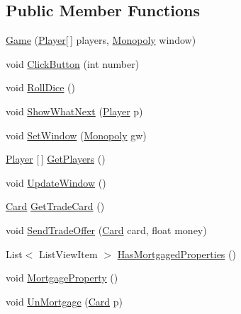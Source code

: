 \subsection*{Public Member Functions}
\begin{DoxyCompactItemize}
\item 
\mbox{\hyperlink{class_monopoly_1_1_main_1_1_game_ae2591415ce9bb2ca618cf67cc000792c}{Game}} (\mbox{\hyperlink{class_monopoly_1_1_players_1_1_player}{Player}}\mbox{[}$\,$\mbox{]} players, \mbox{\hyperlink{class_monopoly_1_1_main_1_1_monopoly}{Monopoly}} window)
\item 
void \mbox{\hyperlink{class_monopoly_1_1_main_1_1_game_a2eacf89a5ff116f370fd4bab3dc6222a}{Click\+Button}} (int number)
\item 
void \mbox{\hyperlink{class_monopoly_1_1_main_1_1_game_a8db7b2f4e7f53446d3af3312545eb5ee}{Roll\+Dice}} ()
\item 
void \mbox{\hyperlink{class_monopoly_1_1_main_1_1_game_a8b3ae822f53278aadf9358a4b770b0fa}{Show\+What\+Next}} (\mbox{\hyperlink{class_monopoly_1_1_players_1_1_player}{Player}} p)
\item 
void \mbox{\hyperlink{class_monopoly_1_1_main_1_1_game_a22b8fa77077e7bd5530e1e4e0d05a4ff}{Set\+Window}} (\mbox{\hyperlink{class_monopoly_1_1_main_1_1_monopoly}{Monopoly}} gw)
\item 
\mbox{\hyperlink{class_monopoly_1_1_players_1_1_player}{Player}} \mbox{[}$\,$\mbox{]} \mbox{\hyperlink{class_monopoly_1_1_main_1_1_game_a8af6993d846bf252611b45b60df485e8}{Get\+Players}} ()
\item 
void \mbox{\hyperlink{class_monopoly_1_1_main_1_1_game_a3f982631780b7f01e57529c35703b528}{Update\+Window}} ()
\item 
\mbox{\hyperlink{class_monopoly_1_1_cards_1_1_card}{Card}} \mbox{\hyperlink{class_monopoly_1_1_main_1_1_game_a0c45f6a7bfb03efd2e4257e90d920ffa}{Get\+Trade\+Card}} ()
\item 
void \mbox{\hyperlink{class_monopoly_1_1_main_1_1_game_ae62facb9164f78451e20826727cbc50f}{Send\+Trade\+Offer}} (\mbox{\hyperlink{class_monopoly_1_1_cards_1_1_card}{Card}} card, float money)
\item 
List$<$ List\+View\+Item $>$ \mbox{\hyperlink{class_monopoly_1_1_main_1_1_game_a0f0a816b6c70b1f8fe2934c82cff032b}{Has\+Mortgaged\+Properties}} ()
\item 
void \mbox{\hyperlink{class_monopoly_1_1_main_1_1_game_abd65b1836ea5f425b7c4f911b011f719}{Mortgage\+Property}} ()
\item 
void \mbox{\hyperlink{class_monopoly_1_1_main_1_1_game_a91033504683bc8e684e9c938181e955b}{Un\+Mortgage}} (\mbox{\hyperlink{class_monopoly_1_1_cards_1_1_card}{Card}} p)
\end{DoxyCompactItemize}

